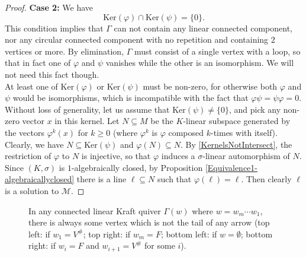 \documentclass[12pt]{amsart}
\theoremstyle{definition}
\newcommand{\<}{\langle}   %
\renewcommand{\>}{\rangle} %
\begin{document}
\begin{proof}
    \textbf{Case 2:} We have 
    \begin{equation}\label{KernelsNotIntersect}
        \mathrm{Ker}(\varphi) \cap \mathrm{Ker}(\psi) = \{0\}.
    \end{equation}
    This condition implies that $\Gamma$ can not contain any linear connected component, nor any circular connected component with no repetition and containing $2$ vertices or more. By elimination, $\Gamma$ must consist of a single vertex with a loop, so that in fact one of $\varphi$ and $\psi$ vanishes while the other is an isomorphism. We will not need this fact though.\\
    At least one of $\mathrm{Ker}(\varphi)$ or $\mathrm{Ker}(\psi)$ must be non-zero, for otherwise both $\varphi$ and $\psi$ would be isomorphisms, which is incompatible with the fact that $\varphi\psi = \psi\varphi = 0$. Without loss of generality, let us assume that $\mathrm{Ker}(\psi) \not = \{0\}$, and pick any non-zero vector $x$ in this kernel. Let $N \subseteq M$ be the $K$-linear subspace generated by the vectors $\varphi^k(x)$ for $k \geq 0$ (where $\varphi^k$ is $\varphi$ composed $k$-times with itself). Clearly, we have $N \subseteq \mathrm{Ker}(\psi)$ and $\varphi(N) \subseteq N$. By \eqref{KernelsNotIntersect}, the restriction of $\varphi$ to $N$ is injective, so that $\varphi$ induces a $\sigma$-linear automorphism of $N$. Since $(K,\sigma)$ is $1$-algebraically closed, by Proposition \ref{Equivalence1-algebraicallyclosed} there is a line $\ell \subseteq N$ such that $\varphi(\ell) = \ell$. Then clearly $\ell$ is a solution to $\mathcal M$.
\end{proof}

\begin{figure} 
\centering
{}
\caption{In any connected linear Kraft quiver $\Gamma(w)$ where $w = w_m\cdots w_1$, there is always some vertex which is not the tail of any arrow (top left: if $w_1 = V^{\#}$; top right: if $w_m = F$; bottom left: if $w = \emptyset$; bottom right: if $w_i = F$ and $w_{i+1} = V^{\#}$ for some $i$).}
\label{Figure7}
\end{figure}
\end{document}
